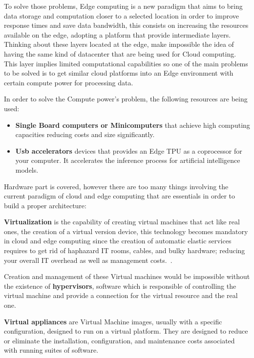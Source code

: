 To solve those problems, Edge computing is a new paradigm that aims to bring data storage and computation closer to a selected location in order to improve response times and save data bandwidth, this consists on increasing the resources available on the edge, adopting a platform that provide intermediate layers.
Thinking about these layers located at the edge, make impossible the idea of having the same kind of datacenter that are being used for Cloud computing. This layer implies limited computational capabilities so one of the main problems to be solved is to get similar cloud platforms into an Edge environment with certain compute power for processing data.

\newpage
In order to solve the Compute power's problem, the following resources are being used:
\begin{itemize}
  \item \textbf{Single Board computers or Minicomputers} that achieve high computing capacities reducing costs and size significantly.
  \item \textbf{Usb accelerators} devices that provides an Edge TPU as a coprocessor for your computer. It accelerates the inference process for artificial intelligence models.
\end{itemize}

Hardware part is covered, however there are too many things involving the current paradigm of cloud and edge computing that are essentials in order to build a proper architecture:

\textbf{Virtualization} is the capability of creating virtual machines that act like real ones, the creation of a virtual version device, this technology becomes mandatory in cloud and edge computing since the creation of automatic elastic services requires to get rid of haphazard IT rooms, cables, and bulky hardware; reducing your overall IT overhead as well as management costs.~\cite{virt_def}.

Creation and management of these Virtual machines would be impossible without the existence of \textbf{hypervisors}, software which is responsible of controlling the virtual machine and provide a connection for the virtual resource and the real one.

\textbf{Virtual appliances} are Virtual Machine images, usually with a specific configuration, designed to run on a virtual platform. They are designed to reduce or eliminate the installation, configuration, and maintenance costs associated with running suites of software.~\cite{GEN:Virtualization:2010}

